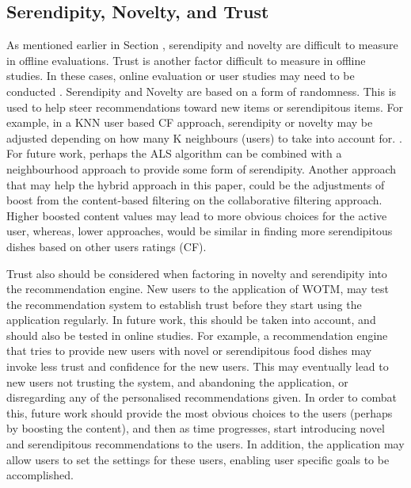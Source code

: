 \subsection{Serendipity, Novelty, and Trust}
As mentioned earlier in Section , serendipity and novelty are difficult to measure in offline evaluations. Trust is another factor difficult to measure in offline studies. In these cases, online evaluation or user studies may need to be conducted . Serendipity and Novelty are based on a form of randomness. This is used to help steer recommendations toward new items or serendipitous items. For example, in a KNN user based CF approach, serendipity or novelty may be adjusted depending on how many K neighbours (users) to take into account for. . For future work, perhaps the ALS algorithm can be combined with a neighbourhood approach to provide some form of serendipity. Another approach that may help the hybrid approach in this paper, could be the adjustments of boost from the content-based filtering on the collaborative filtering approach. Higher boosted content values may lead to more obvious choices for the active user, whereas, lower approaches, would be similar in finding more serendipitous dishes based on other users ratings (CF).  

Trust also should be considered when factoring in novelty and serendipity into the recommendation engine. New users to the application of WOTM, may test the recommendation system to establish trust before they start using the application regularly. In future work, this should be taken into account, and should also be tested in online studies. For example, a recommendation engine that tries to provide new users with novel or serendipitous food dishes may invoke less trust and confidence for the new users. This may eventually lead to new users not trusting the system, and abandoning the application, or disregarding any of the personalised recommendations given. In order to combat this, future work should provide the most obvious choices to the users (perhaps by boosting the content), and then as time progresses, start introducing novel and serendipitous recommendations to the users. In addition, the application may allow users to set the settings for these users, enabling user specific goals to be accomplished. 

